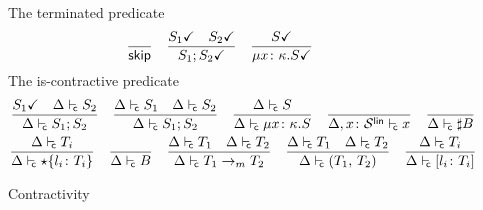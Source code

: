 \begin{figure}[tp]
  The terminated predicate \hfill{}
  \begin{equation*}
    \frac{}{\mathsf{skip}}
    \quad
    \frac{
      {S_1}\checkmark
      \quad
      {S_2}\checkmark
    }{
      {S_1;S_2}\checkmark
    }
    \quad
    \frac{
      {S}\checkmark
    }{
      {\mu{x\colon\kappa}.{S}}\checkmark
}
  \end{equation*}
  The is-contractive predicate \hfill{}
  \begin{gather*}
    \frac{
      \isDone{S_1}
      \quad
      \isContr{S_2}
    }{
      \isContr{S_1;S_2}
    }
    \quad
    \frac{
      \isContr{S_1}
      \quad
      \isContr{S_2}
    }{
      \isContr{S_1;S_2}
    }
    \quad
    \frac{
      \isContr S
    }{
      \isContr{\rect{x\colon\kind}S}
    }
    \quad
    \frac{}{
      \isContr[\Delta,x\colon\kindk\kinds\link] x
    }
    \quad
    \frac{}{
      \isContr{\msgt B}
    }
    \\
    \frac{
      \isContr{T_i}
    }{
      \isContr{\choicet{l_i\colon T_i}}
    }
    \quad
    \frac{}{
      \isContr{B}
    }
    \quad
    \frac{
      \isContr{T_1}
      \quad
      \isContr{T_2}      
    }{
      \isContr{\funt{T_1}{T_2}}
    }
    \quad
    \frac{
      \isContr{T_1}
      \quad
      \isContr{T_2}      
    }{
      \isContr{\pairt{T_1}{T_2}}
    }
    \quad
    \frac{
      \isContr{T_i}
    }{
      \isContr{\datat{l_i\colon T_i}}
    }
  \end{gather*}
  \caption{Contractivity}
  \label{fig:contractivity}
\end{figure}

